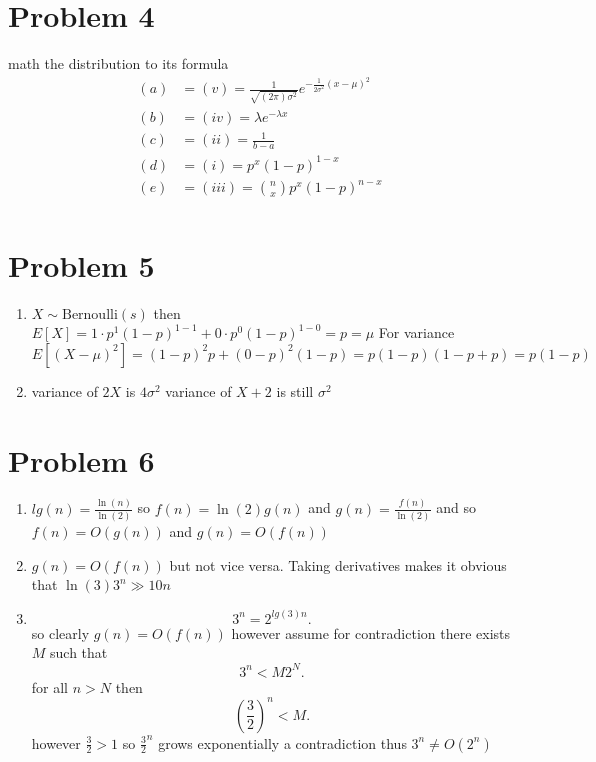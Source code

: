 \documentclass[11pt]{article}
\newcommand{\solution}[1]{{{\color{blue}{\bf Solution:} {#1}}}}
\begin{document}
\section{Problem 4}
math the distribution to its formula
\solution{
    \begin{align*}
        (a) &= (v) = \frac{1}{\sqrt{(2\pi)\sigma^2}}e^{-\frac{1}{2\sigma^2}(x-\mu)^2}\\
        (b) &= (iv) = \lambda e^{-\lambda x}\\
        (c) &= (ii) = \frac{1}{b-a}\\
        (d) &= (i) = p^{x}(1-p)^{1-x}\\
        (e) &= (iii) = \binom{n}{x}p^{x}(1-p)^{n-x}\\
    \end{align*}
}

\section{Problem 5}
\solution{
    \begin{enumerate}
        \item $X \sim \text{Bernoulli}(s)$ then $E[X] = 1\cdot p^{1}(1-p)^{1-1} + 0\cdot p^{0}(1-p)^{1-0} = p = \mu$ 
            For variance $E[(X-\mu)^2] = (1-p)^2p + (0-p)^2(1-p) = p(1-p)(1-p +p) = p(1-p)$ 
        \item variance of $2X$ is $4\sigma^2$ variance of $X+2$ is still $\sigma^2$
    \end{enumerate}
}

\section{Problem 6}
\solution{
    \begin{enumerate}
        \item $lg(n) = \frac{\ln(n)}{\ln(2)}$ so $f(n) = \ln(2)g(n)$ and $g(n) = \frac{f(n)}{\ln(2)}$ and so $f(n) = O(g(n))$ and $g(n) = O(f(n))$ 
        \item $g(n) = O(f(n))$ but not vice versa. Taking derivatives makes it obvious that $\ln(3)3^{n} \gg 10n$ 
        \item 
            \[
            3^{n} = 2^{lg(3)n}
            .\] 
            so clearly $g(n) = O(f(n))$ however assume for contradiction there exists $M$ such that
            \[
            3^{n} < M 2^{N}
            .\] 
            for all $n > N$ then
             \[
                 (\frac{3}{2})^{n} < M
            .\] 
            however $\frac{3}{2} > 1$ so $\frac{3}{2}^{n}$ grows exponentially a contradiction thus $3^{n} \ne O(2^{n})$
    \end{enumerate}
}
\end{document}

